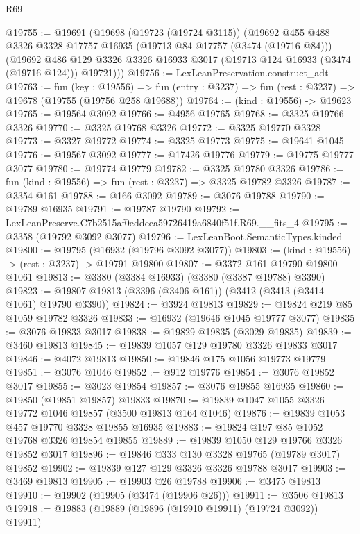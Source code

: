 \begin{lexlean}{R69}
\begin{coremodule}
@19755 := @19691
    (@19698
      (@19723 (@19724 @3115))
      (@19692
        @455
        @488
        @3326
        @3328
        @17757
        @16935
        (@19713 @84 @17757 (@3474 (@19716 @84)))
        (@19692
          @486
          @129
          @3326
          @3326
          @16933
          @3017
          (@19713 @124 @16933 (@3474 (@19716 @124)))
          @19721)))
@19756 := LexLeanPreservation.construct_adt
@19763 := fun (key : @19556) =>
  fun (entry : @3237) => fun (rest : @3237) => @19678 (@19755 (@19756 @258 @19688))
@19764 := (kind : @19556) -> @19623
@19765 := @19564 @3092
@19766 := @4956 @19765
@19768 := @3325 @19766 @3326
@19770 := @3325 @19768 @3326
@19772 := @3325 @19770 @3328
@19773 := @3327 @19772
@19774 := @3325 @19773
@19775 := @19641 @1045
@19776 := @19567 @3092
@19777 := @17426 @19776
@19779 := @19775 @19777 @3077
@19780 := @19774 @19779
@19782 := @3325 @19780 @3326
@19786 := fun (kind : @19556) => fun (rest : @3237) => @3325 @19782 @3326
@19787 := @3354 @161
@19788 := @166 @3092
@19789 := @3076 @19788
@19790 := @19789 @16935
@19791 := @19787 @19790
@19792 := LexLeanPreserve.C7b2515af0eddeea59726419a6840f51f.R69.__fits_4
@19795 := @3358 (@19792 @3092 @3077)
@19796 := LexLeanBoot.SemanticTypes.kinded
@19800 := @19795 (@16932 (@19796 @3092 @3077))
@19803 := (kind : @19556) -> (rest : @3237) -> @19791 @19800
@19807 := @3372 @161 @19790 @19800 @1061
@19813 := @3380 (@3384 @16933) (@3380 (@3387 @19788) @3390)
@19823 := @19807 @19813 (@3396 (@3406 @161)) (@3412 (@3413 (@3414 @1061) @19790 @3390))
@19824 := @3924 @19813
@19829 := @19824 @219 @85 @1059 @19782 @3326
@19833 := @16932 (@19646 @1045 @19777 @3077)
@19835 := @3076 @19833 @3017
@19838 := @19829 @19835 (@3029 @19835)
@19839 := @3460 @19813
@19845 := @19839 @1057 @129 @19780 @3326 @19833 @3017
@19846 := @4072 @19813
@19850 := @19846 @175 @1056 @19773 @19779
@19851 := @3076 @1046
@19852 := @912 @19776
@19854 := @3076 @19852 @3017
@19855 := @3023 @19854
@19857 := @3076 @19855 @16935
@19860 := @19850 (@19851 @19857) @19833
@19870 := @19839 @1047 @1055 @3326 @19772 @1046 @19857 (@3500 @19813 @164 @1046)
@19876 := @19839 @1053 @457 @19770 @3328 @19855 @16935
@19883 := @19824 @197 @85 @1052 @19768 @3326 @19854 @19855
@19889 := @19839 @1050 @129 @19766 @3326 @19852 @3017
@19896 := @19846 @333 @130 @3328 @19765 (@19789 @3017) @19852
@19902 := @19839 @127 @129 @3326 @3326 @19788 @3017
@19903 := @3469 @19813
@19905 := @19903 @26 @19788
@19906 := @3475 @19813
@19910 := @19902 (@19905 (@3474 (@19906 @26)))
@19911 := @3506 @19813
@19918 := @19883 (@19889 (@19896 (@19910 @19911) (@19724 @3092)) @19911)

\end{coremodule}
\end{lexlean}
